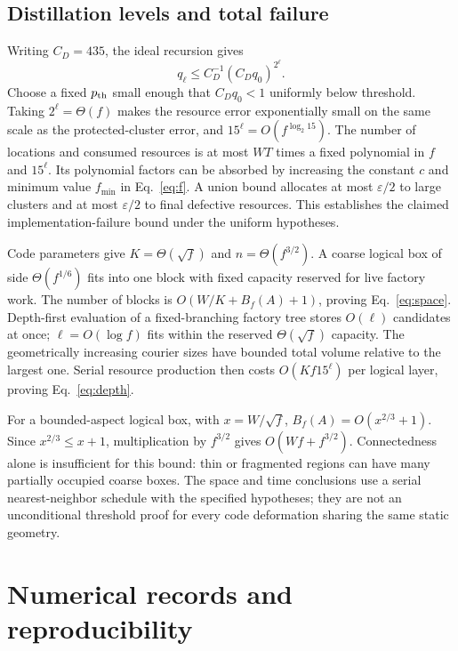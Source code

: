 \subsection{Distillation levels and total failure}
Writing $C_D=435$, the ideal recursion gives
\begin{equation}
 q_\ell\le C_D^{-1}(C_Dq_0)^{2^\ell}.
\end{equation}
Choose a fixed $p_{\rm th}$ small enough that $C_Dq_0<1$ uniformly
below threshold. Taking $2^\ell=\Theta(f)$ makes the resource error
exponentially small on the same scale as the protected-cluster error,
and $15^\ell=O(f^{\log_2 15})$. The number of locations and consumed
resources is at most $WT$ times a fixed polynomial in $f$ and
$15^\ell$. Its polynomial factors can be absorbed by increasing the
constant $c$ and minimum value $f_{\min}$ in Eq.~\eqref{eq:f}. A union
bound allocates at most $\varepsilon/2$ to large clusters and at most
$\varepsilon/2$ to final defective resources. This establishes the
claimed implementation-failure bound under the uniform hypotheses.

Code parameters give $K=\Theta(\sqrt f)$ and $n=\Theta(f^{3/2})$.
A coarse logical box of side $\Theta(f^{1/6})$ fits into one block with
fixed capacity reserved for live factory work. The number of blocks is
$O(W/K+B_f(A)+1)$, proving Eq.~\eqref{eq:space}. Depth-first evaluation
of a fixed-branching factory tree stores $O(\ell)$ candidates at once;
$\ell=O(\log f)$ fits within the reserved $\Theta(\sqrt f)$ capacity.
The geometrically increasing courier sizes have bounded total volume
relative to the largest one. Serial resource production then costs
$O(Kf15^\ell)$ per logical layer, proving Eq.~\eqref{eq:depth}.

For a bounded-aspect logical box, with $x=W/\sqrt f$,
$B_f(A)=O(x^{2/3}+1)$. Since $x^{2/3}\le x+1$, multiplication by
$f^{3/2}$ gives $O(Wf+f^{3/2})$. Connectedness alone is insufficient
for this bound: thin or fragmented regions can have many partially
occupied coarse boxes. The space and time conclusions use a serial
nearest-neighbor schedule with the specified hypotheses; they are not
an unconditional threshold proof for every code deformation sharing the
same static geometry.

\section{Numerical records and reproducibility}
\label{app:numerical}

